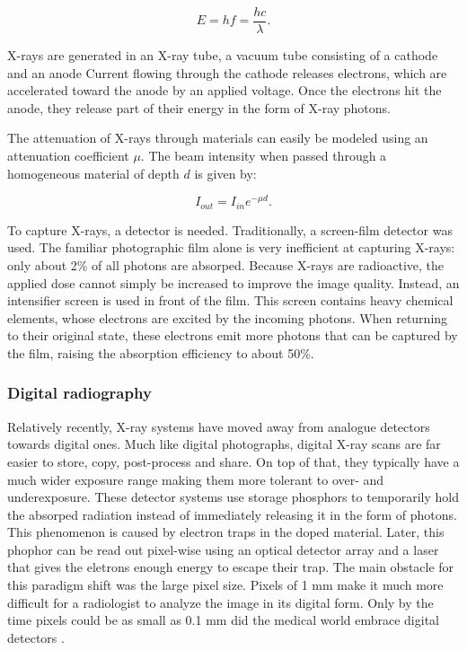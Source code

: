 \begin{equation}
	E = hf = \frac{hc}{\lambda}.
\end{equation}

X-rays are generated in an X-ray tube, a vacuum tube consisting of a cathode and
an anode Current flowing through the cathode releases electrons,
which are accelerated toward the anode by an applied voltage. Once the electrons
hit the anode, they release part of their energy in the form of X-ray photons.

The attenuation of X-rays through materials can easily be modeled using an
attenuation coefficient $\mu$. The beam intensity when passed through a
homogeneous material of depth $d$ is given by: 

\begin{equation}
	I_{out} = I_{in} e^{-\mu d}.
\end{equation}

To capture X-rays, a detector is needed. Traditionally, a screen-film detector
was used. The familiar photographic film alone is very inefficient
at capturing X-rays: only about 2\% of all photons are absorped. Because X-rays
are radioactive, the applied dose cannot simply be increased to improve the
image quality. Instead, an intensifier screen is used in front of the film. This
screen contains heavy chemical elements, whose electrons are excited by the
incoming photons. When returning to their original state, these electrons emit
more photons that can be captured by the film, raising the absorption efficiency
to about 50\%.

\subsubsection{Digital radiography}
Relatively recently, X-ray systems have moved away from analogue detectors
towards digital ones. Much like digital photographs, digital X-ray scans are far
easier to store, copy, post-process and share. On top of that, they typically
have a much wider exposure range making them more tolerant to over- and
underexposure. These detector systems use storage phosphors to temporarily hold
the absorped radiation instead of immediately releasing it in the form of
photons. This phenomenon is caused by electron traps in the doped material.
Later, this phophor can be read out pixel-wise using an optical detector array
and a laser that gives the eletrons enough energy to escape their trap. The main
obstacle for this paradigm shift was the large pixel size. Pixels of 1 mm make
it much more difficult for a radiologist to analyze the image in its digital
form. Only by the time pixels could be as small as 0.1 mm did the medical world
embrace digital detectors \cite{review}.

